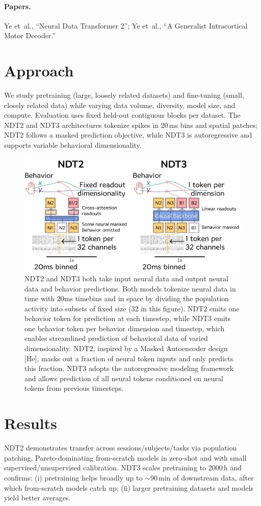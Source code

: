 \documentclass[12pt,oneside]{report}
\begin{document}
\paragraph{Papers.} Ye et~al., ``Neural Data Transformer 2''; Ye et~al., ``A Generalist Intracortical Motor Decoder.''

\section{Approach}
We study pretraining (large, loosely related datasets) and fine-tuning (small, closely related data) while varying data volume, diversity, model size, and compute. Evaluation uses fixed held-out contiguous blocks per dataset. The NDT2 and NDT3 architectures tokenize spikes in 20\,ms bins and spatial patches; NDT2 follows a masked prediction objective, while NDT3 is autoregressive and supports variable behavioral dimensionality.

\begin{figure}[h]
  \centering
  \includegraphics[width=0.5\linewidth]{ch2_ndt_models.png}
  \caption{NDT2 and NDT3 both take input neural data and output neural data and behavior predictions. Both models tokenize neural data in time with 20ms timebins and in space by dividing the population activity into subsets of fixed size (32 in this figure). NDT2 emits one behavior token for prediction at each timestep, while NDT3 emits one behavior token per behavior dimension and timestep, which enables streamlined prediction of behavioral data of varied dimensionality. NDT2, inspired by a Masked Autoencoder design [He], masks out a fraction of neural token inputs and only predicts this fraction. NDT3 adopts the autoregressive modeling framework and allows prediction of all neural tokens conditioned on neural tokens from previous timesteps.}
  \label{fig:ndt_models}
\end{figure}

\section{Results}
NDT2 demonstrates transfer across sessions/subjects/tasks via population patching, Pareto-dominating from-scratch models in zero-shot and with small supervised/unsupervised calibration. NDT3 scales pretraining to 2000\,h and confirms: (i) pretraining helps broadly up to $\sim$90\,min of downstream data, after which from-scratch models catch up; (ii) larger pretraining datasets and models yield better averages.
\end{document}
